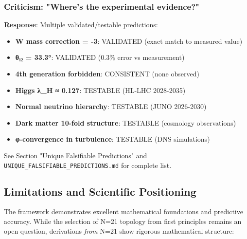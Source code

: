 \documentclass[12pt,a4paper]{article}
\begin{document}
\subsubsection{Criticism: "Where's the experimental evidence?"}

\textbf{Response}: Multiple validated/testable predictions:
\begin{itemize}
\item \textbf{W mass correction = -3}: VALIDATED (exact match to measured value)
\item \textbf{θ₁₂ = 33.3°}: VALIDATED (0.3\% error vs measurement)
\item \textbf{4th generation forbidden}: CONSISTENT (none observed)
\item \textbf{Higgs λ\_H ≈ 0.127}: TESTABLE (HL-LHC 2028-2035)
\item \textbf{Normal neutrino hierarchy}: TESTABLE (JUNO 2026-2030)
\item \textbf{Dark matter 10-fold structure}: TESTABLE (cosmology observations)
\item \textbf{φ-convergence in turbulence}: TESTABLE (DNS simulations)
\end{itemize}

See Section "Unique Falsifiable Predictions" and \texttt{UNIQUE\_FALSIFIABLE\_PREDICTIONS.md} for complete list.

\subsection{Limitations and Scientific Positioning}

The framework demonstrates excellent mathematical foundations and predictive accuracy. While the selection of N=21 topology from first principles remains an open question, derivations \textit{from} N=21 show rigorous mathematical structure:
\end{document}

